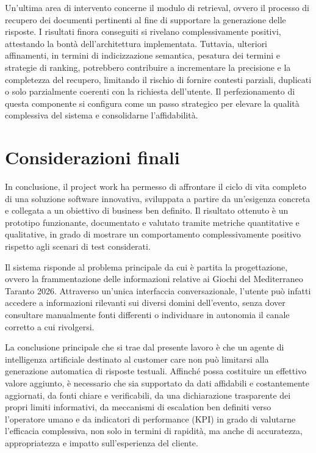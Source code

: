 Un'ultima area di intervento concerne il modulo di retrieval, ovvero il processo di recupero dei documenti pertinenti al fine di supportare la generazione delle risposte. I risultati finora conseguiti si rivelano complessivamente positivi, attestando la bontà dell'architettura implementata. Tuttavia, ulteriori affinamenti, in termini di indicizzazione semantica, pesatura dei termini e strategie di ranking, potrebbero contribuire a incrementare la precisione e la completezza del recupero, limitando il rischio di fornire contesti parziali, duplicati o solo parzialmente coerenti con la richiesta dell'utente. Il perfezionamento di questa componente si configura come un passo strategico per elevare la qualità complessiva del sistema e consolidarne l'affidabilità.

\section{Considerazioni finali}

In conclusione, il project work ha permesso di affrontare il ciclo di vita completo di una soluzione software innovativa, sviluppata a partire da un’esigenza concreta e collegata a un obiettivo di business ben definito. Il risultato ottenuto è un prototipo funzionante, documentato e valutato tramite metriche quantitative e qualitative, in grado di mostrare un comportamento complessivamente positivo rispetto agli scenari di test considerati.

Il sistema risponde al problema principale da cui è partita la progettazione, ovvero la frammentazione delle informazioni relative ai Giochi del Mediterraneo Taranto 2026. Attraverso un’unica interfaccia conversazionale, l’utente può infatti accedere a informazioni rilevanti sui diversi domini dell’evento, senza dover consultare manualmente fonti differenti o individuare in autonomia il canale corretto a cui rivolgersi.

La conclusione principale che si trae dal presente lavoro è che un agente di intelligenza artificiale destinato al customer care non può limitarsi alla generazione automatica di risposte testuali. Affinché possa costituire un effettivo valore aggiunto, è necessario che sia supportato da dati affidabili e costantemente aggiornati, da fonti chiare e verificabili, da una dichiarazione trasparente dei propri limiti informativi, da meccanismi di escalation ben definiti verso l'operatore umano e da indicatori di performance (KPI) in grado di valutarne l'efficacia complessiva, non solo in termini di rapidità, ma anche di accuratezza, appropriatezza e impatto sull'esperienza del cliente.

